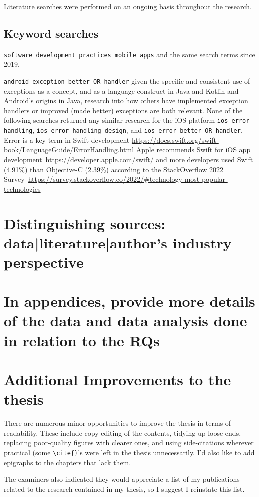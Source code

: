 Literature searches were performed on an ongoing basis throughout the research.

\subsection{Keyword searches}


\verb|software development practices mobile apps| and the same search terms since 2019.

\verb|android exception better OR handler| given the specific and consistent use of exceptions as a concept, and as a language construct in Java and Kotlin and Android's origins in Java, research into how others have implemented exception handlers or improved (made better) exceptions are both relevant. None of the following searches returned any similar research for the iOS platform \verb|ios error handling|, \verb|ios error handling design|, and \verb|ios error better OR handler|. Error is a key term in Swift development \url{https://docs.swift.org/swift-book/LanguageGuide/ErrorHandling.html} Apple recommends Swift for iOS app development~\url{https://developer.apple.com/swift/} and more developers used Swift (4.91\%) than Objective-C (2.39\%) according to the StackOverflow 2022 Survey~\url{https://survey.stackoverflow.co/2022/\#technology-most-popular-technologies} 




\section{Distinguishing sources: data|literature|author's industry perspective}


\section{In appendices, provide more details of the data and data analysis done in relation to the RQs}


\section{Additional Improvements to the thesis}
There are numerous minor opportunities to improve the thesis in terms of readability. These include copy-editing of the contents, tidying up loose-ends, replacing poor-quality figures with clearer ones, and using side-citations wherever practical (some \verb+\cite{}+'s were left in the thesis unnecessarily. I'd also like to add epigraphs to the chapters that lack them.

The examiners also indicated they would appreciate a list of my publications related to the research contained in my thesis,  so I suggest I reinstate this list.
